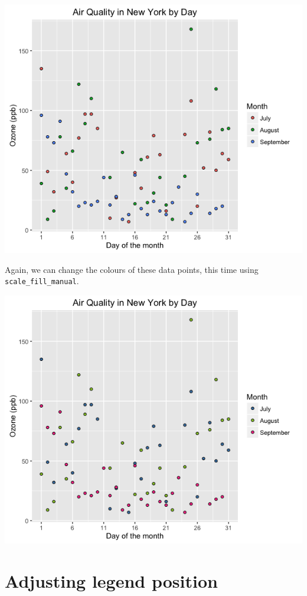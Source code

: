 \begin{center}\includegraphics[width=0.55\linewidth]{0_all_posts_pdf/scatter_9-1} \end{center}

Again, we can change the colours of these data points, this time using
\texttt{scale\_fill\_manual}.

\begin{Shaded}
\begin{Highlighting}[]
\StringTok{ }\NormalTok{(}\NormalTok{, }\NormalTok{, }\NormalTok{)}

\StringTok{ }\StringTok{ }\NormalTok{(} 
\end{Highlighting}
\end{Shaded}

\begin{center}\includegraphics[width=0.55\linewidth]{0_all_posts_pdf/scatter_10-1} \end{center}

\section{Adjusting legend
position}\label{adjusting-legend-position-3}

